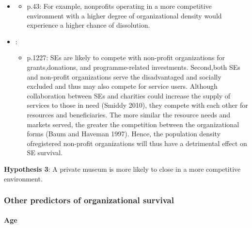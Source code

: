 \documentclass[12pt]{article}
\begin{document}
\begin{itemize}
\begin{itemize}
\end{itemize}
\item \cite{Lu_Shon_Zhang_2019_dissolution}
\begin{itemize}
\item p.43: For example, nonprofits operating in a more competitive environment with a higher degree of organizational density would experience a higher chance of dissolution.
\end{itemize}
\item \cite{Haugh_etal_2021_nascent}:
\begin{itemize}
\item p.1227: SEs are likely to compete with non-profit organizations for grants,donations, and programme-related investments. Second,both SEs and non-profit organizations serve the disadvantaged and socially excluded and thus may also compete for service users. Although collaboration between SEs and charities could increase the supply of services to those in need (Smiddy 2010), they compete with each other for resources and beneficiaries. The more similar the resource needs and markets served, the greater the competition between the organizational forms (Baum and Haveman 1997). Hence, the population density ofregistered non-profit organizations will thus have a detrimental effect on SE survival.
\end{itemize}
\end{itemize}

\textbf{Hypothesis 3}: A private museum is more likely to close in a more competitive environment.



\subsubsection*{Other predictors of organizational survival}

\paragraph*{Age}
\end{document}
